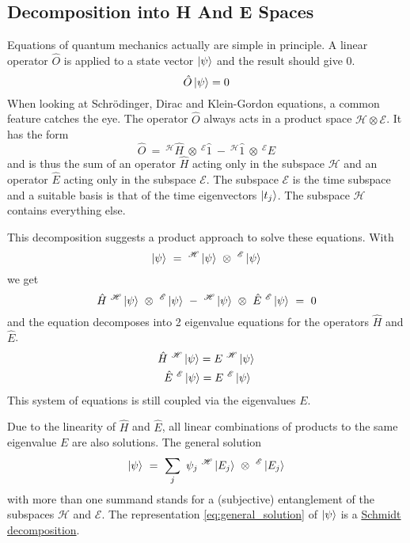 \documentclass[12pt]{article}
\begin{document}
\subsection{Decomposition into H And E Spaces}
Equations of quantum mechanics actually are simple in principle. A linear operator $\hat{O}$ is applied to a state vector $\ket{\psi}$ and the result should give $0$.
\begin{equation*} 
\hat{O}\ket{\psi} = 0 
\end{equation*}
When looking at Schrödinger, Dirac and Klein-Gordon equations, a common feature catches the eye. The operator $\hat{O}$ always acts in a product space $\mathscr{H} \otimes \mathscr{E}$. It has the form 
\begin{equation*} 
\hat{O}\ =\ ^\mathscr{H}\hat{H}\ \otimes\ ^\mathscr{E}\hat{1}\ -\ ^\mathscr{H}\hat{1}\ \otimes\ ^\mathscr{E}\hat{E}
\end{equation*}
and is thus the sum of an operator $\hat{H}$ acting only in the subspace $\mathscr{H}$ and an operator $\hat{E}$ acting only in the subspace $\mathscr{E}$. The subspace $\mathscr{E}$ is the time subspace and a suitable basis is that of the time eigenvectors $\ket{t_j}$. The subspace $\mathscr{H}$ contains everything else.

This decomposition suggests a product approach to solve these equations. With
\begin{equation*} 
\ket{\psi}\ =\ ^\mathscr{H}\ket{\psi}\ \otimes\ ^\mathscr{E}\ket{\psi}
\end{equation*}
we get
\begin{equation} 
\label{eq:productspace}
\hat{H}\ ^\mathscr{H}\ket{\psi}\ \otimes\ ^\mathscr{E}\ket{\psi}
\ - \ 
^\mathscr{H}\ket{\psi}\ \otimes\ \hat{E}\ ^\mathscr{E}\ket{\psi} \ =\ 0
\end{equation}
and the equation decomposes into 2 eigenvalue equations for the operators $\hat{H}$ and $\hat{E}$.
\begin{equation}
\label{eq:system}
\begin{split}
\hat{H}\ ^\mathscr{H}\ket{\psi} = E\ ^\mathscr{H}\ket{\psi}\\
\hat{E}\ ^\mathscr{E}\ket{\psi} = E\ ^\mathscr{E}\ket{\psi}\ 
\end{split}
\end{equation}
This system of equations is still coupled via the eigenvalues $E$.

Due to the linearity of $\hat{H}$ and $\hat{E}$, all linear combinations of products to the same eigenvalue $E$ are also solutions. The general solution
\begin{equation}
\label{eq:general_solution}
\ket{\psi}\ =\ \sum_j\ \psi_j\ ^\mathscr{H}\ket{E_j}\ \otimes\ ^\mathscr{E}\ket{E_j}
\end{equation}
with more than one summand stands for a (subjective) entanglement of the subspaces $\mathscr{H}$ and $\mathscr{E}$. The representation \eqref{eq:general_solution} of $\ket{\psi}$ is a \href{https://en.wikipedia.org/wiki/Schmidt_decomposition}{Schmidt decomposition}.
\end{document}
